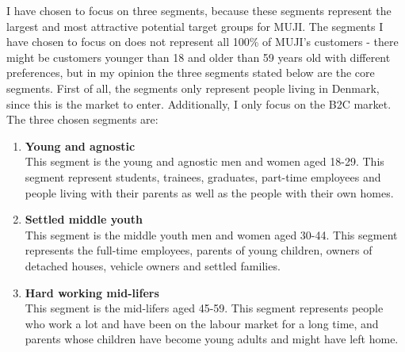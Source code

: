 I have chosen to focus on three segments, because these segments represent the largest and most attractive potential target groups for MUJI. The segments I have chosen to focus on does not represent all 100\% of MUJI's customers - there might be customers younger than 18 and older than 59 years old with different preferences, but in my opinion the three segments stated below are the core segments. First of all, the segments only represent people living in Denmark, since this is the market to enter. Additionally, I only focus on the B2C market.
\newpage
The three chosen segments are:
\begin{enumerate}[label=\Alph*]
\item \textbf{Young and agnostic}\\
This segment is the young and agnostic men and women aged 18-29. This segment represent students, trainees, graduates, part-time employees and people living with their parents as well as the people with their own homes.
\item \textbf{Settled middle youth}\\
This segment is the middle youth men and women aged 30-44. This segment represents the full-time employees, parents of young children, owners of detached houses, vehicle owners and settled families.
\item \textbf{Hard working mid-lifers}\\ 
This segment is the mid-lifers aged 45-59. This segment represents people who work a lot and have been on the labour market for a long time, and parents whose children have become young adults and might have left home.  
\end{enumerate}



